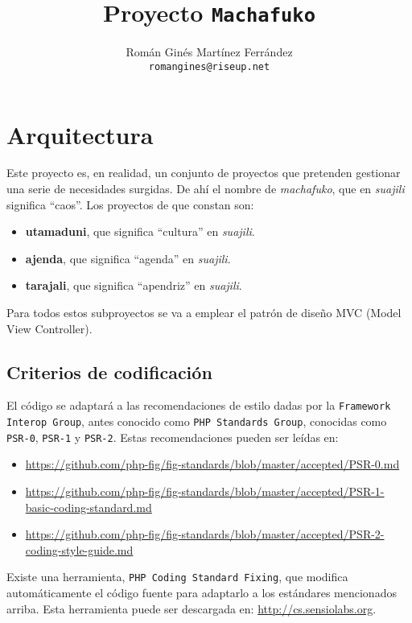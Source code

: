 \documentclass[12pt,twoside,a4paper]{article}
\title{Proyecto \texttt{Machafuko}}
\author{Román Ginés Martínez Ferrández \\ \texttt{romangines@riseup.net}}
\begin{document}
\maketitle
\thispagestyle{fancy} %
\tableofcontents

\section{Arquitectura}
Este proyecto es, en realidad, un conjunto de proyectos que pretenden gestionar una serie de necesidades surgidas. De ahí el nombre de \emph{machafuko}, que en \emph{suajili} significa ``caos''. Los proyectos de que constan son:
\begin{itemize}
\item \textbf{utamaduni}, que significa ``cultura'' en \emph{suajili}.
\item \textbf{ajenda}, que significa ``agenda'' en \emph{suajili}.
\item \textbf{tarajali}, que significa ``apendriz'' en \emph{suajili}.
\end{itemize}
Para todos estos subproyectos se va a emplear el patrón de diseño MVC (Model View Controller).

\subsection{Criterios de codificación}
El código se adaptará a las recomendaciones de estilo dadas por la \texttt{Framework Interop Group}, antes conocido como \texttt{PHP Standards Group}, conocidas como \texttt{PSR-0}, \texttt{PSR-1} y \texttt{PSR-2}. Estas recomendaciones pueden ser leídas en:
\begin{itemize}
\item \url{https://github.com/php-fig/fig-standards/blob/master/accepted/PSR-0.md}
\item \url{https://github.com/php-fig/fig-standards/blob/master/accepted/PSR-1-basic-coding-standard.md}
\item \url{https://github.com/php-fig/fig-standards/blob/master/accepted/PSR-2-coding-style-guide.md}
\end{itemize}

Existe una herramienta, \texttt{PHP Coding Standard Fixing}, que modifica automáticamente el código fuente para adaptarlo a los estándares mencionados arriba. Esta herramienta puede ser descargada en: \url{http://cs.sensiolabs.org}.
\end{document}
